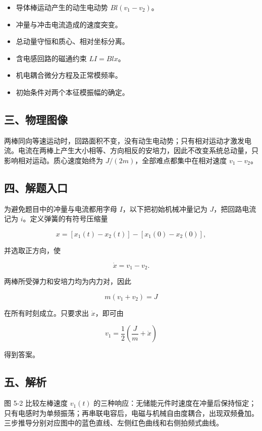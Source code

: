 \documentclass[12pt,a4paper,UTF8]{ctexart}
\newcommand{\tightlist}{\setlength{\itemsep}{0pt}\setlength{\parskip}{0pt}}
\begin{document}
\begin{itemize}
\tightlist
\item
  导体棒运动产生的动生电动势 \(Bl(v_1-v_2)\)。
\item
  冲量与冲击电流造成的速度突变。
\item
  总动量守恒和质心、相对坐标分离。
\item
  含电感回路的磁通约束 \(LI=Blx\)。
\item
  机电耦合微分方程及正常模频率。
\item
  初始条件对两个本征模振幅的确定。
\end{itemize}

\subsection{三、物理图像}\label{ux4e09ux7269ux7406ux56feux50cf-4}

两棒同向等速运动时，回路面积不变，没有动生电动势；只有相对运动才激发电流。电流在两棒上产生大小相等、方向相反的安培力，因此不改变系统总动量，只影响相对运动。质心速度始终为
\(J/(2m)\)，全部难点都集中在相对速度 \(v_1-v_2\)。

\subsection{四、解题入口}\label{ux56dbux89e3ux9898ux5165ux53e3-4}

为避免题目中的冲量与电流都用字母 \(I\)，以下把初始机械冲量记为
\(J\)，把回路电流记为 \(i\)。定义弹簧的有符号压缩量

\[x=[x_1(t)-x_2(t)]-[x_1(0)-x_2(0)],\]

并选取正方向，使

\[\dot x=v_1-v_2.\]

两棒所受弹力和安培力均为内力对，因此

\[m(v_1+v_2)=J\]

在所有时刻成立。只要求出 \(\dot x\)，即可由

\[v_1=\frac12\left(\frac Jm+\dot x\right) \tag{48}\]

得到答案。

\subsection{五、解析}\label{ux4e94ux89e3ux6790-4}

图 5-2 比较左棒速度 \(v_1(t)\)
的三种响应：无储能元件时速度在冲量后保持恒定；只有电感时为单频振荡；再串联电容后，电磁与机械自由度耦合，出现双频叠加。三步推导分别对应图中的蓝色直线、左侧红色曲线和右侧拍频式曲线。
\end{document}
